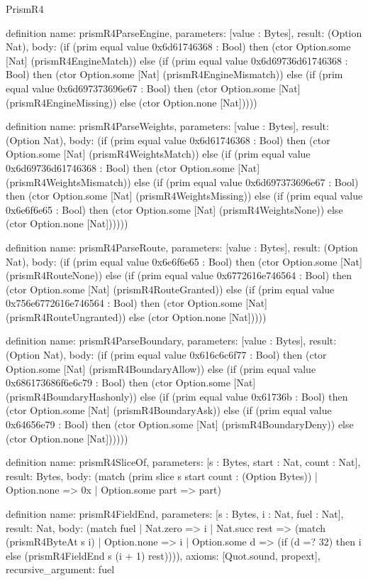 \begin{lexlean}{PrismR4}
\begin{semanticmodule}
definition{
  name: prismR4ParseEngine,
  parameters: [value : Bytes],
  result: (Option Nat),
  body: (if (prim equal value 0x6d61746368 : Bool) then (ctor Option.some [Nat] (prismR4EngineMatch)) else (if (prim equal value 0x6d69736d61746368 : Bool) then (ctor Option.some [Nat] (prismR4EngineMismatch)) else (if (prim equal value 0x6d697373696e67 : Bool) then (ctor Option.some [Nat] (prismR4EngineMissing)) else (ctor Option.none [Nat]))))
}

definition{
  name: prismR4ParseWeights,
  parameters: [value : Bytes],
  result: (Option Nat),
  body: (if (prim equal value 0x6d61746368 : Bool) then (ctor Option.some [Nat] (prismR4WeightsMatch)) else (if (prim equal value 0x6d69736d61746368 : Bool) then (ctor Option.some [Nat] (prismR4WeightsMismatch)) else (if (prim equal value 0x6d697373696e67 : Bool) then (ctor Option.some [Nat] (prismR4WeightsMissing)) else (if (prim equal value 0x6e6f6e65 : Bool) then (ctor Option.some [Nat] (prismR4WeightsNone)) else (ctor Option.none [Nat])))))
}

definition{
  name: prismR4ParseRoute,
  parameters: [value : Bytes],
  result: (Option Nat),
  body: (if (prim equal value 0x6e6f6e65 : Bool) then (ctor Option.some [Nat] (prismR4RouteNone)) else (if (prim equal value 0x6772616e746564 : Bool) then (ctor Option.some [Nat] (prismR4RouteGranted)) else (if (prim equal value 0x756e6772616e746564 : Bool) then (ctor Option.some [Nat] (prismR4RouteUngranted)) else (ctor Option.none [Nat]))))
}

definition{
  name: prismR4ParseBoundary,
  parameters: [value : Bytes],
  result: (Option Nat),
  body: (if (prim equal value 0x616c6c6f77 : Bool) then (ctor Option.some [Nat] (prismR4BoundaryAllow)) else (if (prim equal value 0x686173686f6e6c79 : Bool) then (ctor Option.some [Nat] (prismR4BoundaryHashonly)) else (if (prim equal value 0x61736b : Bool) then (ctor Option.some [Nat] (prismR4BoundaryAsk)) else (if (prim equal value 0x64656e79 : Bool) then (ctor Option.some [Nat] (prismR4BoundaryDeny)) else (ctor Option.none [Nat])))))
}

definition{
  name: prismR4SliceOf,
  parameters: [s : Bytes, start : Nat, count : Nat],
  result: Bytes,
  body: (match (prim slice s start count : (Option Bytes))
    | Option.none => 0x
    | Option.some part => part)
}

definition{
  name: prismR4FieldEnd,
  parameters: [s : Bytes, i : Nat, fuel : Nat],
  result: Nat,
  body: (match fuel
    | Nat.zero => i
    | Nat.succ rest => (match (prismR4ByteAt s i)
      | Option.none => i
      | Option.some d => (if (d =? 32) then i else (prismR4FieldEnd s (i + 1) rest)))),
  axioms: [Quot.sound, propext],
  recursive_argument: fuel
}


\end{semanticmodule}
\end{lexlean}
